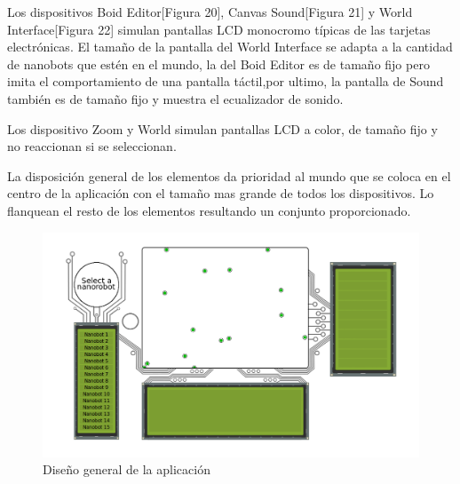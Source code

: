 Los dispositivos Boid Editor[Figura 20], Canvas Sound[Figura 21] y World Interface[Figura 22] simulan pantallas LCD monocromo típicas de las tarjetas electrónicas. El tamaño de la pantalla del World Interface se adapta a la cantidad de nanobots que estén en el mundo, la del Boid Editor es de tamaño fijo pero imita el comportamiento de una pantalla táctil,por ultimo, la pantalla de Sound también es de tamaño fijo y muestra el ecualizador de sonido.

Los dispositivo Zoom y World simulan pantallas LCD a color, de tamaño fijo y no reaccionan si se seleccionan. 

La disposición general de los elementos da prioridad al mundo que se coloca en el centro de la aplicación con el tamaño mas grande de todos los dispositivos. Lo flanquean el resto de los elementos resultando un conjunto proporcionado.

\begin{figure}[H]
 \centering
 \includegraphics[scale=0.28]{../images/diseno_general.png}
 \caption{Diseño general de la aplicación}

 \label{fig:../images/diseno_general.png}
\end{figure}


